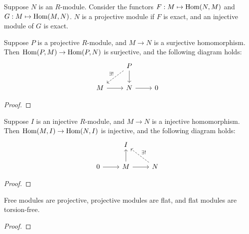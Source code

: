 \begin{definition}
    Suppose \(N\) is an \(R\)-module.
    Consider the functors \(F: M \mapsto \operatorname{Hom}(N,M)\) and \(G: M \mapsto \operatorname{Hom}(M,N)\).
    \(N\) is a projective module if \(F\) is exact,
    and an injective module of \(G\) is exact.
\end{definition}
\begin{proposition}
    Suppose \(P\) is a projective \(R\)-module,
    and \(M \to N\) is a surjective homomorphism.
    Then \(\operatorname{Hom}(P,M) \to \operatorname{Hom}(P,N)\) is surjective,
    and the following diagram holds:
    \begin{equation*}
        \begin{tikzcd}
            & P \arrow[dashrightarrow]{dl}[swap]{\exists!} \arrow{d} \\
            M \arrow{r} & N \arrow{r} & 0
        \end{tikzcd}
    \end{equation*}
\end{proposition}
\begin{proof}
    
\end{proof}
\begin{proposition}
    Suppose \(I\) is an injective \(R\)-module,
    and \(M \to N\) is a injective homomorphism.
    Then \(\operatorname{Hom}(M,I) \to \operatorname{Hom}(N,I)\) is injective,
    and the following diagram holds:
    \begin{equation*}
        \begin{tikzcd}
            & I \\
            0 \arrow{r} & M \arrow{u} \arrow{r} & N \arrow[dashrightarrow]{ul}[swap]{\exists!}
        \end{tikzcd}
    \end{equation*}
\end{proposition}
\begin{proof}
    
\end{proof}

\begin{proposition}
    Free modules are projective,
    projective modules are flat,
    and flat modules are torsion-free.
\end{proposition}
\begin{proof}
    
\end{proof}

